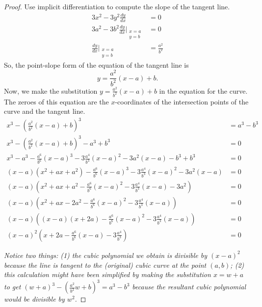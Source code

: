 \documentclass[12pt]{article}
\theoremstyle{plain}
\begin{document}
\begin{proof}
  Use implicit differentiation to compute the slope of the tangent line.
  \begin{align*}
    3x^2-3y^2\frac{dy}{dx}              &= 0 \\
    3a^2-3b^2\frac{dy}{dx}\Bigg|_{\substack{x=a \\ y=b}}  &= 0 \\
    \frac{dy}{dx}\Bigg|_{\substack{x=a \\ y=b}}           &= \frac{a^2}{b^2}
  \end{align*}
  So, the point-slope form of the equation of the tangent line is
  \[
    y=\frac{a^2}{b^2}(x-a)+b.
  \]
  Now, we make the substitution $y=\frac{a^2}{b^2}(x-a)+b$ in the equation for the curve. The zeroes of this equation are the $x$-coordinates of the intersection points of the curve and the tangent line.
  \begin{align*}
    x^3-\left(\frac{a^2}{b^2}(x-a)+b\right)^3                                       &= a^3-b^3 \\
    x^3-\left(\frac{a^2}{b^2}(x-a)+b\right)^3-a^3+b^3                               &= 0 \\
    x^3-a^3-\frac{a^6}{b^6}(x-a)^3-3\frac{a^4}{b^3}(x-a)^2-3a^2(x-a)-b^3+b^3        &= 0 \\
    (x-a)(x^2+ax+a^2)-\frac{a^6}{b^6}(x-a)^3-3\frac{a^4}{b^3}(x-a)^2-3a^2(x-a)      &= 0 \\
    (x-a)\left(x^2+ax+a^2-\frac{a^6}{b^6}(x-a)^2-3\frac{a^4}{b^3}(x-a)-3a^2\right)  &= 0 \\
    (x-a)\left(x^2+ax-2a^2-\frac{a^6}{b^6}(x-a)^2-3\frac{a^4}{b^3}(x-a)\right)      &= 0 \\
    (x-a)\left((x-a)(x+2a)-\frac{a^6}{b^6}(x-a)^2-3\frac{a^4}{b^3}(x-a)\right)      &= 0 \\
    (x-a)^2\left(x+2a-\frac{a^6}{b^6}(x-a)-3\frac{a^4}{b^3}\right)                  &= 0
  \end{align*}

  \emph{Notice two things: (1) the cubic polynomial we obtain is divisible by $(x-a)^2$ because the line is tangent to the (original) cubic curve at the point $(a,b)$; (2) this calculation might have been simplified by making the substitution $x=w+a$ to get $(w+a)^3-\left(\frac{a^2}{b^2}w+b\right)^3=a^3-b^3$ because the resultant cubic polynomial would be divisible by $w^2$.}


\end{proof}
\end{document}
